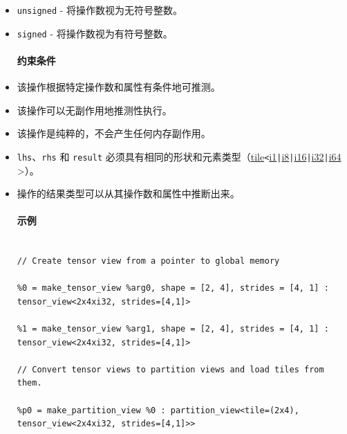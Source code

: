 \documentclass{article}
\begin{document}
\begin{itemize}
\item \texttt{unsigned} - 将操作数视为无符号整数。
\item \texttt{signed} - 将操作数视为有符号整数。




\paragraph{约束条件}


\item 该操作根据特定操作数和属性有条件地可推测。
\item 该操作可以无副作用地推测性执行。
\item 该操作是纯粹的，不会产生任何内存副作用。
\item \texttt{lhs}、\texttt{rhs} 和 \texttt{result} 必须具有相同的形状和元素类型（\href{https://docs.nvidia.com/cuda/tile-ir/latest/sections/types.html#type-tile}{tile}\texttt{<}\href{https://docs.nvidia.com/cuda/tile-ir/latest/sections/types.html#subsection-element-types}{i1}\texttt{|}\href{https://docs.nvidia.com/cuda/tile-ir/latest/sections/types.html#subsection-element-types}{i8}\texttt{|}\href{https://docs.nvidia.com/cuda/tile-ir/latest/sections/types.html#subsection-element-types}{i16}\texttt{|}\href{https://docs.nvidia.com/cuda/tile-ir/latest/sections/types.html#subsection-element-types}{i32}\texttt{|}\href{https://docs.nvidia.com/cuda/tile-ir/latest/sections/types.html#subsection-element-types}{i64} >）。
\item 操作的结果类型可以从其操作数和属性中推断出来。




\paragraph{示例}


\begin{lstlisting}

// Create tensor view from a pointer to global memory

%0 = make_tensor_view %arg0, shape = [2, 4], strides = [4, 1] : tensor_view<2x4xi32, strides=[4,1]>

%1 = make_tensor_view %arg1, shape = [2, 4], strides = [4, 1] : tensor_view<2x4xi32, strides=[4,1]>

// Convert tensor views to partition views and load tiles from them.

%p0 = make_partition_view %0 : partition_view<tile=(2x4), tensor_view<2x4xi32, strides=[4,1]>>


\end{lstlisting}
\end{itemize}
\end{document}
